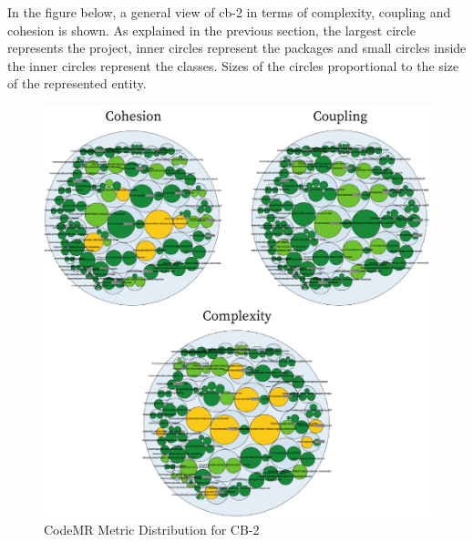 In the figure below, a general view of cb-2 in terms of complexity, coupling and cohesion is shown. As explained in the previous section, the largest circle represents the project, inner circles represent the packages and small circles inside the inner circles represent the classes. Sizes of the circles proportional to the size of the represented entity.
\begin{figure}[ht!]
    \centering
    \includegraphics[scale=1.1]{figures/cb-2-package.png}
    \caption{CodeMR Metric Distribution for CB-2}
    \label{fig:cb-2-package}
\end{figure}
\FloatBarrier






